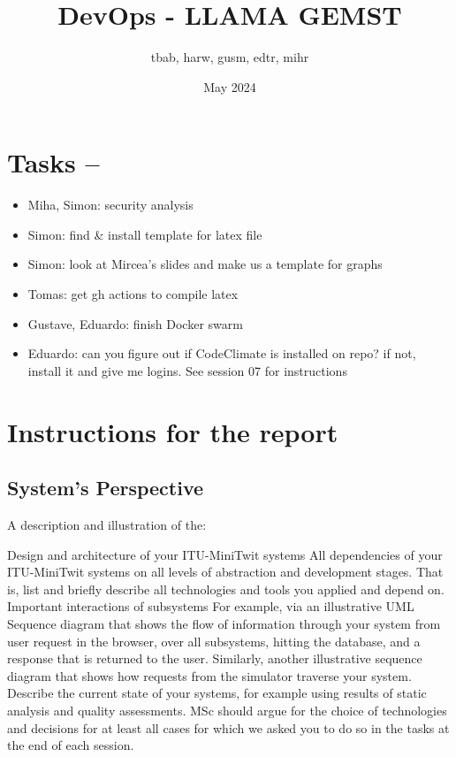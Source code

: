 \documentclass{article}
\title{DevOps - LLAMA GEMST}
\author{tbab, harw, gusm, edtr, mihr}
\date{May 2024}
\begin{document}
\maketitle

\section{Tasks --}

\begin{itemize}
  \item Miha, Simon: security analysis
  \item Simon: find \& install template for latex file
  \item Simon: look at Mircea's slides and make us a template for graphs
  \item Tomas: get gh actions to compile latex
  \item Gustave, Eduardo: finish Docker swarm
  \item Eduardo: can you figure out if CodeClimate is installed on repo? if not, install it and give me logins. See session 07 for instructions
\end{itemize}

\section{Instructions for the report}
\subsection{System's Perspective}

A description and illustration of the:

Design and architecture of your ITU-MiniTwit systems
All dependencies of your ITU-MiniTwit systems on all levels of abstraction and development stages. That is, list and briefly describe all technologies and tools you applied and depend on.
Important interactions of subsystems
For example, via an illustrative UML Sequence diagram that shows the flow of information through your system from user request in the browser, over all subsystems, hitting the database, and a response that is returned to the user.
Similarly, another illustrative sequence diagram that shows how requests from the simulator traverse your system.
Describe the current state of your systems, for example using results of static analysis and quality assessments.
MSc should argue for the choice of technologies and decisions for at least all cases for which we asked you to do so in the tasks at the end of each session.
\end{document}
